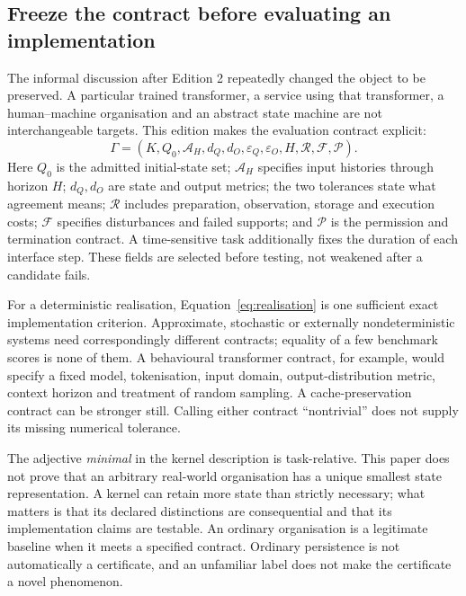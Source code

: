 \subsection{Freeze the contract before evaluating an implementation}\label{subsec:contractfreeze}
The informal discussion after Edition 2 repeatedly changed the object to be preserved. A particular trained transformer, a service using that transformer, a human--machine organisation and an abstract state machine are not interchangeable targets. This edition makes the evaluation contract explicit:
\begin{equation}\label{eq:contract3}
 \Gamma=(K,Q_0,\mathcal A_H,d_Q,d_O,\varepsilon_Q,\varepsilon_O,H,\mathcal R,\mathcal F,\mathcal P).
\end{equation}
Here $Q_0$ is the admitted initial-state set; $\mathcal A_H$ specifies input histories through horizon $H$; $d_Q,d_O$ are state and output metrics; the two tolerances state what agreement means; $\mathcal R$ includes preparation, observation, storage and execution costs; $\mathcal F$ specifies disturbances and failed supports; and $\mathcal P$ is the permission and termination contract. A time-sensitive task additionally fixes the duration of each interface step. These fields are selected before testing, not weakened after a candidate fails.

For a deterministic realisation, Equation~\eqref{eq:realisation} is one sufficient exact implementation criterion. Approximate, stochastic or externally nondeterministic systems need correspondingly different contracts; equality of a few benchmark scores is none of them. A behavioural transformer contract, for example, would specify a fixed model, tokenisation, input domain, output-distribution metric, context horizon and treatment of random sampling. A cache-preservation contract can be stronger still. Calling either contract ``nontrivial'' does not supply its missing numerical tolerance.

The adjective \emph{minimal} in the kernel description is task-relative. This paper does not prove that an arbitrary real-world organisation has a unique smallest state representation. A kernel can retain more state than strictly necessary; what matters is that its declared distinctions are consequential and that its implementation claims are testable. An ordinary organisation is a legitimate baseline when it meets a specified contract. Ordinary persistence is not automatically a certificate, and an unfamiliar label does not make the certificate a novel phenomenon.

